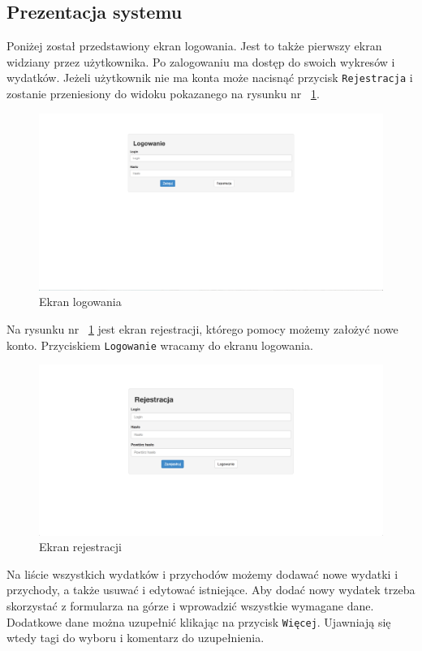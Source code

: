 \documentclass[10pt,titlepage]{article}
\begin{document}
\subsection{Prezentacja systemu}
Poniżej został przedstawiony ekran logowania. Jest to także pierwszy ekran widziany przez użytkownika. Po zalogowaniu ma dostęp do swoich wykresów i wydatków. Jeżeli użytkownik nie ma konta może nacisnąć przycisk \verb|Rejestracja| i zostanie przeniesiony do widoku pokazanego na rysunku nr ~\ref{screen:register}.
\begin{figure}[H]
  \centering
  \includegraphics[scale=0.2]{images/screen_logowanie.png}
  \caption{Ekran logowania}
\end{figure}
Na rysunku nr ~\ref{screen:register} jest ekran rejestracji, którego pomocy możemy założyć nowe konto. Przyciskiem \verb|Logowanie| wracamy do ekranu logowania.
\begin{figure}[H]
  \centering
  \includegraphics[scale=0.2]{images/screen_rejestracja.png}
  \caption{Ekran rejestracji}
  \label{screen:register}
\end{figure}
\par Na liście wszystkich wydatków i przychodów możemy dodawać nowe wydatki i przychody, a także usuwać i edytować istniejące. Aby dodać nowy wydatek trzeba skorzystać z formularza na górze i wprowadzić wszystkie wymagane dane. Dodatkowe dane można uzupełnić klikając na przycisk \verb|Więcej|. Ujawniają się wtedy tagi do wyboru i komentarz do uzupełnienia.
\end{document}
